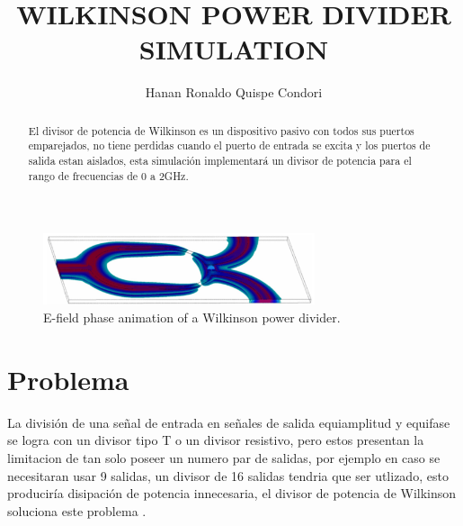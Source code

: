 \documentclass[a4paper]{IEEEtran} %
\begin{document}
\title{WILKINSON POWER DIVIDER SIMULATION}
\author{Hanan Ronaldo Quispe Condori}
\maketitle
\begin{abstract}
El divisor de potencia de Wilkinson es un dispositivo pasivo con todos sus puertos emparejados, no tiene perdidas cuando el puerto de entrada se excita y los puertos de salida estan aislados, esta simulación implementará un divisor de potencia para el rango de frecuencias de 0 a 2GHz.
\end{abstract}
\begin{figure}[h]
    \centering
        \includegraphics[width=8cm]{imagenes/img2}
        \caption{E-field phase animation of a Wilkinson power divider.}
        \label{fig:animation}
\end{figure}
\section{Problema}
\label{sec:Problem}
La división de una señal de entrada en señales de salida equiamplitud y equifase se logra con un divisor tipo T o un divisor resistivo, pero estos presentan la limitacion de tan solo poseer un numero par de salidas, por ejemplo en caso se necesitaran usar 9 salidas, un divisor de 16 salidas tendria que ser utlizado, esto produciría disipación de potencia innecesaria, el divisor de potencia de Wilkinson soluciona este problema \cite{wilkinson1960n}.
\end{document}
